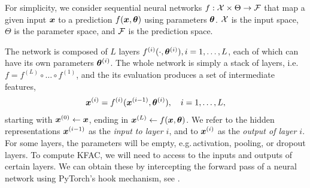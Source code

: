For simplicity, we consider sequential neural networks $f: {\mathcal{X}} \times \Theta \to {\mathcal{F}}$ that map a given input ${\bm{x}}$ to a prediction $f({\bm{x}}, {\bm{\theta}})$ using parameters ${\bm{\theta}}$.
${\mathcal{X}}$ is the input space, $\Theta$ is the parameter space, and ${\mathcal{F}}$ is the prediction space.

The network is composed of $L$ layers $f^{(i)}(\cdot, {\bm{\theta}}^{(i)}), i=1,\dots, L$, each of which can have its own parameters ${\bm{\theta}}^{(i)}$.
The whole network is simply a stack of layers, i.e.
$f = f^{(L)} \circ \dots \circ f^{(1)}$, and the its evaluation produces a set of intermediate features,
\begin{align*}
  {\bm{x}}^{(i)} = f^{(i)}({\bm{x}}^{(i-1)}, {\bm{\theta}}^{(i)}), \quad i=1,\dots, L,
\end{align*}
starting with ${\bm{x}}^{(0)} \leftarrow {\bm{x}}$, ending in ${\bm{x}}^{(L)} \leftarrow f({\bm{x}}, {\bm{\theta}})$.
We refer to the hidden representations ${\bm{x}}^{(i-1)}$ as the \emph{input to layer $i$}, and to ${\bm{x}}^{(i)}$ as the \emph{output of layer $i$}.
For some layers, the parameters will be empty, e.g.\,activation, pooling, or dropout layers.
To compute KFAC, we will need to access to the inputs and outputs of certain layers.
We can obtain these by intercepting the forward pass of a neural network using PyTorch's hook mechanism, see .

